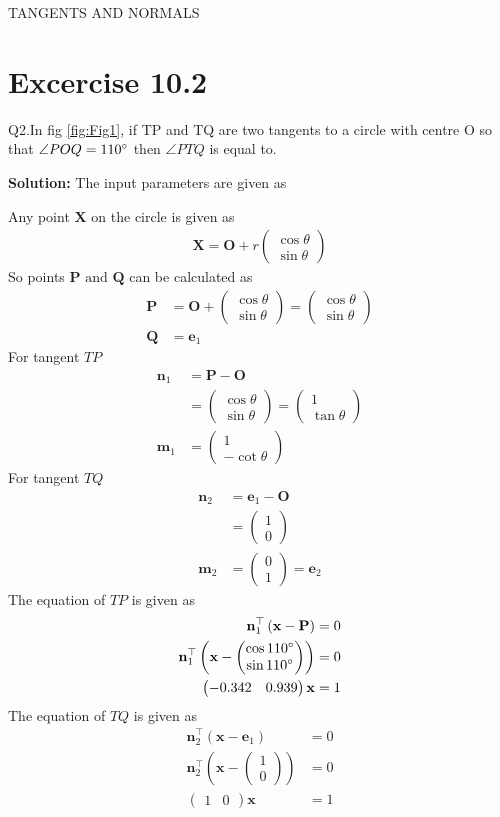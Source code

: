 \documentclass[12pt]{article}
\providecommand{\brak}[1]{\ensuremath{\left(#1\right)}}
\newcommand{\solution}{\noindent \textbf{Solution: }}
\newcommand{\myvec}[1]{\ensuremath{\begin{pmatrix}#1\end{pmatrix}}}
\let\vec\mathbf
\begin{document}
\begin{center}
\textbf\large{TANGENTS AND NORMALS}

\end{center}
\section*{Excercise 10.2}
Q2.In fig \ref{fig:Fig1}, if TP and TQ are two tangents to a circle with centre O so that $\angle{POQ} = 110\degree$ then $\angle{PTQ}$ is equal to.

\solution
The input parameters are given as

Any point $\vec{X}$ on the circle is given as
\begin{align}
	\vec{X} = \vec{O}+r\myvec{\cos\theta\\\sin\theta}
\end{align}
So points $\vec{P} \text{ and } \vec{Q}$ can be calculated as
\begin{align}
	\vec{P} &= \vec{O}+\myvec{\cos\theta\\\sin\theta} = \myvec{\cos\theta\\\sin\theta}\\
	\vec{Q} &= \vec{e}_1
\end{align}
For tangent $TP$
\begin{align}
	\vec{n}_1 &= \vec{P}-\vec{O}\\
	&= \myvec{\cos\theta\\\sin\theta} =  \myvec{1\\\tan\theta}\\
	\vec{m}_1 &= \myvec{1\\-\cot\theta}
\end{align}
For tangent $TQ$
\begin{align}
	\vec{n}_2 &= \vec{e}_1-\vec{O}\\
	&= \myvec{1\\0}\\
	\vec{m}_2 &= \myvec{0\\1}=\vec{e}_2
\end{align}
The equation of $TP$ is given as
\begin{align}
	\vec{n}_1^\top\brak{\vec{x}-\vec{P}} &= 0\\
	\vec{n}_1^\top\brak{\vec{x}-\myvec{\cos{110}\degree\\\sin{110}\degree}} &= 0\\
	\label{eq:eq1}
	\myvec{-0.342 & 0.939}\vec{x} &= 1
\end{align}
The equation of $TQ$ is given as
\begin{align}
	\vec{n}_2^\top\brak{\vec{x}-\vec{e}_1} &= 0\\
	\vec{n}_2^\top\brak{\vec{x}-\myvec{1\\0}} &= 0\\
	\label{eq:eq2}
	\myvec{1&0}\vec{x} &= 1
\end{align}
\end{document}
